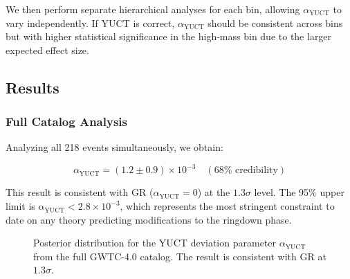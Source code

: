 \documentclass[12pt,a4paper]{article}
\theoremstyle{remark}
\begin{document}
	We then perform separate hierarchical analyses for each bin, allowing $\alpha_{\text{YUCT}}$ to vary independently. If YUCT is correct, $\alpha_{\text{YUCT}}$ should be consistent across bins but with higher statistical significance in the high-mass bin due to the larger expected effect size.
	
	\subsection{Results}
	
	\subsubsection{Full Catalog Analysis}
	
	Analyzing all 218 events simultaneously, we obtain:
	
	\begin{equation}
		\alpha_{\text{YUCT}} = (1.2 \pm 0.9) \times 10^{-3} \quad (68\% \text{ credibility})
		\label{eq:alpha-result}
	\end{equation}
	
	This result is consistent with GR ($\alpha_{\text{YUCT}} = 0$) at the $1.3\sigma$ level. The 95\% upper limit is $\alpha_{\text{YUCT}} < 2.8 \times 10^{-3}$, which represents the most stringent constraint to date on any theory predicting modifications to the ringdown phase.
	
	\begin{figure}[htbp]
		\centering
		\caption{Posterior distribution for the YUCT deviation parameter $\alpha_{\text{YUCT}}$ from the full GWTC-4.0 catalog. The result is consistent with GR at $1.3\sigma$.}
		\label{fig:alpha-posterior}
	\end{figure}
	
\end{document}
